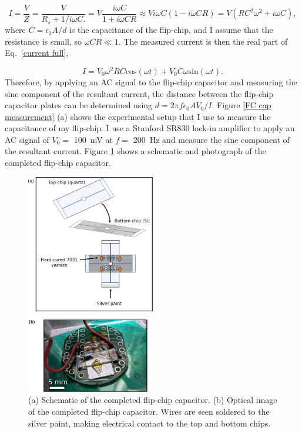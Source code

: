 \documentclass[double,12pt,1in,seploa]{beavtex}
\begin{document}
\begin{equation} \label{current full}
    I = \frac{V}{Z} = \frac{V}{R_s + 1/i\omega C.} = V \frac{i\omega C}{1 + i\omega C R}\approx V i\omega C (1 - i\omega C R) = V(R C^2 \omega ^2 + i\omega C),
\end{equation}
where $C = \epsilon_0 A / d$ is the capacitance of the flip-chip, and I assume that the resistance is small, so $\omega C R \ll 1$. The measured current is then the real part of Eq.\ \ref{current full}, 

\begin{equation}
    I = V_0\omega^2 R C \mathrm{cos}(\omega t) + V_0 C \omega \mathrm{sin}(\omega t).
\end{equation}
Therefore, by applying an AC signal to the flip-chip capacitor and measuring the sine component of the resultant current, the distance between the flip-chip capacitor plates can be determined using $d = 2\pi f \epsilon_0 A V_0 / I$. Figure \ref{FC cap measurement} (a) shows the experimental setup that I use to measure the capacitance of my flip-chip. I use a Stanford SR830 lock-in amplifier to apply an AC signal of $V_0 = $ \SI{100}{\milli\volt} at $f = $ \SI{200}{\hertz} and measure the sine component of the resultant current. Figure \ref{flipping chips} shows a schematic and photograph of the completed flip-chip capacitor.

\begin{figure}
    \includegraphics[width=0.5\textwidth]{flipping chips.pdf}
    \caption{(a) Schematic of the completed flip-chip capacitor. (b) Optical image of the completed flip-chip capacitor. Wires are seen soldered to the silver paint, making electrical contact to the top and bottom chips.}
    \label{flipping chips}
\end{figure}
\end{document}
